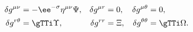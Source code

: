 \begin{equation}
\begin{aligned}
\delta g^{\mu \nu} & = - \ee^{-\sigma} \eta^{\mu \nu} \Psi, & \delta
g^{\mu r} & = 0, & \delta g^{\mu \theta} & = 0,\\ \delta g^{r \theta}
& = \gTTi \Upsilon, & \delta g^{rr} & = \Xi, & \delta g^{\theta
\theta} & = \gTTi \Omega.
\end{aligned}
\end{equation}


